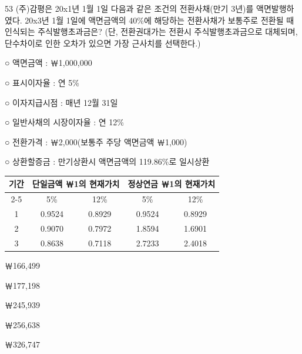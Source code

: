 \begin{question}{53}
(주)감평은 20x1년 1월 1일 다음과 같은 조건의 전환사채(만기 3년)를 액면발행하였다. 20x3년 1월 1일에 액면금액의 40\%에 해당하는 전환사채가 보통주로 전환될 때 인식되는 주식발행초과금은? (단, 전환권대가는 전환시 주식발행초과금으로 대체되며, 단수차이로 인한 오차가 있으면 가장 근사치를 선택한다.)
\begin{framedtext}
○ 액면금액 : ￦1,000,000 \par
○ 표시이자율 : 연 5\% \par
○ 이자지급시점 : 매년 12월 31일 \par
○ 일반사채의 시장이자율 : 연 12\% \par
○ 전환가격 : ￦2,000(보통주 주당 액면금액 ￦1,000) \par
○ 상환할증금 : 만기상환시 액면금액의 119.86\%로 일시상환 \par
\end{framedtext}
{\small\centering
\begin{tabular}{|c|c|c|c|c|}
\hline
\multirow{2}{*}{기간} & \multicolumn{2}{c|}{단일금액 ￦1의 현재가치} & \multicolumn{2}{c|}{정상연금 ￦1의 현재가치} \\ \cline{2-5}
 & 5\% & 12\% & 5\% & 12\% \\ \hline
1 & 0.9524 & 0.8929 & 0.9524 & 0.8929 \\ \hline
2 & 0.9070 & 0.7972 & 1.8594 & 1.6901 \\ \hline
3 & 0.8638 & 0.7118 & 2.7233 & 2.4018 \\ \hline
\end{tabular}\par}
\begin{choices}
  \item ￦166,499
  \item ￦177,198
  \item ￦245,939
  \item ￦256,638
  \item ￦326,747
\end{choices}
\end{question}
